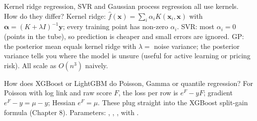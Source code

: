 \begin{qa}{\deep Kernel ridge regression, SVR and Gaussian process regression all use kernels. How do they differ?}
\why Kernel ridge: $\hat f(\mathbf x) = \sum_i\alpha_iK(\mathbf x_i,\mathbf x)$ with $\boldsymbol\alpha = (K + \lambda I)^{-1}\mathbf y$;
every training point has non-zero $\alpha_i$. SVR: most $\alpha_i = 0$ (points in the tube), so prediction is cheaper and small
errors are ignored. GP: the posterior mean equals kernel ridge with $\lambda = $ noise variance; the posterior variance tells you
where the model is unsure (useful for active learning or pricing risk). All scale as $O(n^3)$ naively.
\end{qa}

\begin{qa}{How does XGBoost or LightGBM do Poisson, Gamma or quantile regression?}
\why For Poisson with log link and raw score $F$, the loss per row is $e^F - yF$; gradient $e^F - y = \mu - y$; Hessian $e^F =
\mu$. These plug straight into the XGBoost split-gain formula (Chapter 8). Parameters: ,
, ,  with .
\end{qa}
